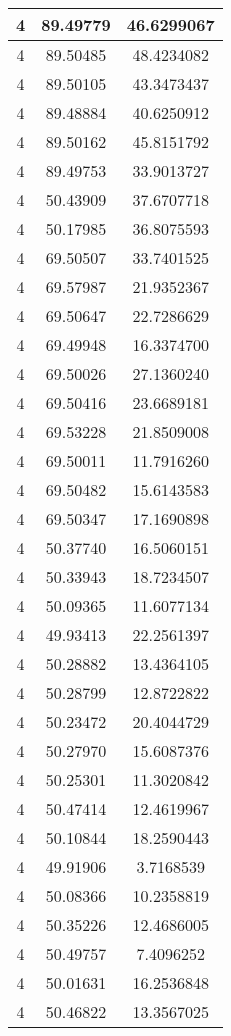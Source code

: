 \documentclass[
]{book}
\begin{document}
\begin{tabular}{c|c|c}
\hline
4 & 89.49779 & 46.6299067\\
\hline
4 & 89.50485 & 48.4234082\\
\hline
4 & 89.50105 & 43.3473437\\
\hline
4 & 89.48884 & 40.6250912\\
\hline
4 & 89.50162 & 45.8151792\\
\hline
4 & 89.49753 & 33.9013727\\
\hline
4 & 50.43909 & 37.6707718\\
\hline
4 & 50.17985 & 36.8075593\\
\hline
4 & 69.50507 & 33.7401525\\
\hline
4 & 69.57987 & 21.9352367\\
\hline
4 & 69.50647 & 22.7286629\\
\hline
4 & 69.49948 & 16.3374700\\
\hline
4 & 69.50026 & 27.1360240\\
\hline
4 & 69.50416 & 23.6689181\\
\hline
4 & 69.53228 & 21.8509008\\
\hline
4 & 69.50011 & 11.7916260\\
\hline
4 & 69.50482 & 15.6143583\\
\hline
4 & 69.50347 & 17.1690898\\
\hline
4 & 50.37740 & 16.5060151\\
\hline
4 & 50.33943 & 18.7234507\\
\hline
4 & 50.09365 & 11.6077134\\
\hline
4 & 49.93413 & 22.2561397\\
\hline
4 & 50.28882 & 13.4364105\\
\hline
4 & 50.28799 & 12.8722822\\
\hline
4 & 50.23472 & 20.4044729\\
\hline
4 & 50.27970 & 15.6087376\\
\hline
4 & 50.25301 & 11.3020842\\
\hline
4 & 50.47414 & 12.4619967\\
\hline
4 & 50.10844 & 18.2590443\\
\hline
4 & 49.91906 & 3.7168539\\
\hline
4 & 50.08366 & 10.2358819\\
\hline
4 & 50.35226 & 12.4686005\\
\hline
4 & 50.49757 & 7.4096252\\
\hline
4 & 50.01631 & 16.2536848\\
\hline
4 & 50.46822 & 13.3567025\\

\end{tabular}
\end{document}
